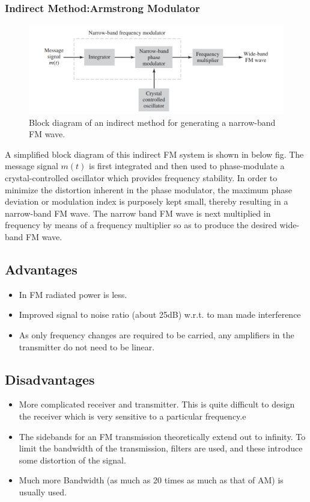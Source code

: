 \documentclass[12pt,a4paper]{article}%
\begin{document}
\begin{flushleft}
	\subsubsection{Indirect Method:Armstrong Modulator}
	\begin{center}
		\begin{figure}[!ht]
			\centering
			\includegraphics[scale=0.4]{./images/BD2.png}
			\caption{Block diagram of an indirect method for generating a narrow-band FM wave.}
			\label{BD2}
		\end{figure}
	\end{center}
	
	
	A simplified block diagram of this indirect FM system is shown in below fig. The message signal $m(t)$ is first integrated and then used to phase-modulate a crystal-controlled oscillator which provides frequency stability. In order to minimize the distortion inherent in the phase modulator, the maximum phase deviation or modulation index is purposely kept small, thereby resulting in a narrow-band FM wave. The narrow band FM wave is next multiplied in frequency by means of a frequency multiplier so as to produce the desired wide-band FM wave.
	\subsection{Advantages}
	\begin{itemize}
		\item{In FM radiated power is less.}
		\item{Improved signal to noise ratio (about 25dB) w.r.t. to man made interference
		}
		\item{As only frequency changes are required to be carried, any amplifiers in the transmitter do not need to be linear.}
	\end{itemize}
	\subsection{Disadvantages}
	\begin{itemize}
		\item{More complicated receiver and transmitter. This is quite difficult to design the receiver which is very sensitive to a particular frequency.e}
		\item{The sidebands for an FM transmission theoretically extend out to infinity. To limit the bandwidth of the transmission, filters are used, and these introduce some distortion of the signal.
		}
		\item{Much more Bandwidth (as much as 20 times as much as that of AM) is usually used.}
	\end{itemize}
	\end{flushleft}
\end{document}
